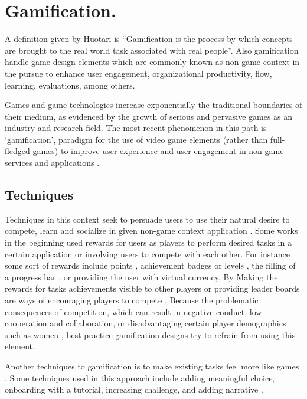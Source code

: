 \section{Gamification.}

A definition given by Huotari  \cite{huotari2012defining} is  “Gamification is
the process by which concepts are brought to the real world task associated with
real people”. Also gamification handle game design elements which are commonly
known as non-game context in the pursue to  enhance user engagement,
organizational productivity, flow, learning, evaluations, among others.

Games and game technologies increase exponentially the traditional boundaries of
their medium, as evidenced by the growth of serious and pervasive games as an
industry and research field. The most recent phenomenon in this path is
‘gamification’, paradigm for the use of video game elements (rather than full-
fledged games) to improve user experience and user engagement in non-game
services and applications \cite{deterding2011gamification}.

\subsection{Techniques}

Techniques in this context seek to persuade users to use their natural desire to
compete, learn and socialize in given non-game context application
\cite{deterding2011game}\cite{hamari2014does}. Some works in the beginning used
rewards for users as players to perform desired tasks in a certain application
or involving users to compete with each other. For instance some sort of
rewards include points \cite{sutter2010browse}, achievement badges or levels
\cite{hamari2011framework}, the filling of a progress bar \cite{o2010get}, or
providing the user with virtual currency. By Making the rewards for  tasks
achievements visible to other players or providing leader boards are ways of
encouraging players to compete \cite{hickman2010total}. Because the  problematic
consequences of competition, which can result in negative conduct, low
cooperation and collaboration, or disadvantaging certain player demographics
such as women \cite{kumar2013gamification}, best-practice gamification designs
try to refrain from using this element.

Another techniques to gamification is to make existing tasks feel more like
games \cite{deterding2010just}. Some techniques used in this approach include
adding meaningful choice, onboarding with a tutorial, increasing challenge, and
adding narrative \cite{mcgonigal2011reality}.
